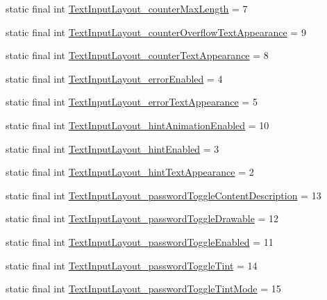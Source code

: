 \begin{CompactItemize}
\item 
static final int \hyperlink{classandroid_1_1support_1_1v4_1_1_r_1_1styleable_a890e200b03fe1fa48be3fe870435e18}{TextInputLayout\_\-counterMaxLength} = 7
\item 
static final int \hyperlink{classandroid_1_1support_1_1v4_1_1_r_1_1styleable_0666dd9e90421e9415028a87a4bfd4d3}{TextInputLayout\_\-counterOverflowTextAppearance} = 9
\item 
static final int \hyperlink{classandroid_1_1support_1_1v4_1_1_r_1_1styleable_e2035c0839f7355fa9fda8b0c9a8dd46}{TextInputLayout\_\-counterTextAppearance} = 8
\item 
static final int \hyperlink{classandroid_1_1support_1_1v4_1_1_r_1_1styleable_552cb08a36003494a2f75ebfe70de3f7}{TextInputLayout\_\-errorEnabled} = 4
\item 
static final int \hyperlink{classandroid_1_1support_1_1v4_1_1_r_1_1styleable_5d6bfe2c5003f1a81addf1df4b6e7503}{TextInputLayout\_\-errorTextAppearance} = 5
\item 
static final int \hyperlink{classandroid_1_1support_1_1v4_1_1_r_1_1styleable_13f535700725e41671bac1815f26fc74}{TextInputLayout\_\-hintAnimationEnabled} = 10
\item 
static final int \hyperlink{classandroid_1_1support_1_1v4_1_1_r_1_1styleable_a55fe41974b69e81336cb0c2750c45fd}{TextInputLayout\_\-hintEnabled} = 3
\item 
static final int \hyperlink{classandroid_1_1support_1_1v4_1_1_r_1_1styleable_c535b56b26e64b26c7f84158fc06f41a}{TextInputLayout\_\-hintTextAppearance} = 2
\item 
static final int \hyperlink{classandroid_1_1support_1_1v4_1_1_r_1_1styleable_bf936cf60adff593b4d8f71e2914568b}{TextInputLayout\_\-passwordToggleContentDescription} = 13
\item 
static final int \hyperlink{classandroid_1_1support_1_1v4_1_1_r_1_1styleable_868c1aeee5f74a15faca475df88aafc1}{TextInputLayout\_\-passwordToggleDrawable} = 12
\item 
static final int \hyperlink{classandroid_1_1support_1_1v4_1_1_r_1_1styleable_42d6b9f952af765e6e832381e786bcd8}{TextInputLayout\_\-passwordToggleEnabled} = 11
\item 
static final int \hyperlink{classandroid_1_1support_1_1v4_1_1_r_1_1styleable_b9b1edb6651d08b5764eaf9bb8fb1d98}{TextInputLayout\_\-passwordToggleTint} = 14
\item 
static final int \hyperlink{classandroid_1_1support_1_1v4_1_1_r_1_1styleable_d9463181356179330f3502a4a7936e5a}{TextInputLayout\_\-passwordToggleTintMode} = 15

\end{CompactItemize}
